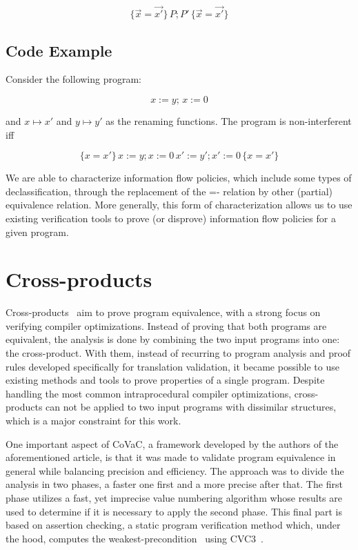 \[ \{\overrightarrow{x} = \overrightarrow{x'}\} \, P; P' \, \{\overrightarrow{x} = \overrightarrow{x'}\} \]


\subsection{Code Example}
\label{subsec:self_composition_example}

Consider the following program:

\[ x := y; \, x := 0 \]

and \(x \mapsto x'\) and \(y \mapsto y'\) as the renaming functions. 
The program is non-interferent iff

\[ \{x = x'\} \, x := y; x := 0 \, x' := y'; x' := 0 \, \{x = x'\} \]

We are able to characterize information flow policies, which include some types of declassification, through the replacement of the =- relation by other (partial) equivalence relation.
More generally, this form of characterization allows us to use existing verification tools to prove (or disprove) information flow policies for a given program.


\section{Cross-products} 
\label{sec:cross_products}

Cross-products~\cite{DBLP:conf/fm/ZaksP08} aim to prove program equivalence, with a strong focus on verifying compiler optimizations.
Instead of proving that both programs are equivalent, the analysis is done by combining the two input programs into one: the cross-product.
With them, instead of recurring to program analysis and proof rules developed specifically for translation validation, it became possible to use existing methods and tools to prove properties of a single program. 
Despite handling the most common intraprocedural compiler optimizations, cross-products can not be applied to two input programs with dissimilar structures, which is a major constraint for this work.

One important aspect of CoVaC, a framework developed by the authors of the aforementioned article, is that it was made to validate program equivalence in general while balancing precision and efficiency.
The approach was to divide the analysis in two phases, a faster one first and a more precise after that.
The first phase utilizes a fast, yet imprecise value numbering algorithm whose results are used to determine if it is necessary to apply the second phase. 
This final part is based on assertion checking, a static program verification method which, under the hood, computes the weakest-precondition~\cite{DBLP:books/ph/Dijkstra76} using CVC3~\cite{cvc3}. 

